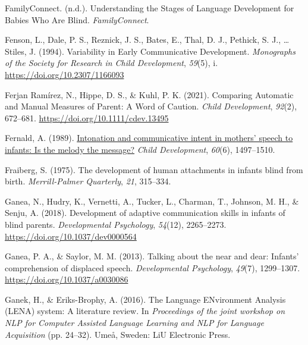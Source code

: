 \documentclass[
  man,floatsintext]{apa6}
\newlength{\cslhangindent}
\newlength{\cslentryspacingunit} %
\newenvironment{CSLReferences}[2] %
 {%
  \setlength{\parindent}{0pt}
  \ifodd #1
  \let\oldpar\par
  \def\par{\hangindent=\cslhangindent\oldpar}
  \fi
  \setlength{\parskip}{#2\cslentryspacingunit}
 }%
 {}
\begin{document}
\begin{CSLReferences}{1}{0}
\leavevmode{}%
FamilyConnect. (n.d.). Understanding the {Stages} of {Language Development} for {Babies Who Are Blind}. \emph{FamilyConnect}.

\leavevmode{}%
Fenson, L., Dale, P. S., Reznick, J. S., Bates, E., Thal, D. J., Pethick, S. J., \ldots{} Stiles, J. (1994). Variability in {Early Communicative Development}. \emph{Monographs of the Society for Research in Child Development}, \emph{59}(5), i. \url{https://doi.org/10.2307/1166093}

\leavevmode{}%
Ferjan Ramírez, N., Hippe, D. S., \& Kuhl, P. K. (2021). Comparing {Automatic} and {Manual Measures} of {Parent}: {A Word} of {Caution}. \emph{Child Development}, \emph{92}(2), 672--681. \url{https://doi.org/10.1111/cdev.13495}

\leavevmode{}%
Fernald, A. (1989). \href{https://www.ncbi.nlm.nih.gov/pubmed/2612255}{Intonation and communicative intent in mothers' speech to infants: Is the melody the message?} \emph{Child Development}, \emph{60}(6), 1497--1510.

\leavevmode{}%
Fraiberg, S. (1975). The development of human attachments in infants blind from birth. \emph{Merrill-Palmer Quarterly}, \emph{21}, 315--334.

\leavevmode{}%
Ganea, N., Hudry, K., Vernetti, A., Tucker, L., Charman, T., Johnson, M. H., \& Senju, A. (2018). Development of adaptive communication skills in infants of blind parents. \emph{Developmental Psychology}, \emph{54}(12), 2265--2273. \url{https://doi.org/10.1037/dev0000564}

\leavevmode{}%
Ganea, P. A., \& Saylor, M. M. (2013). Talking about the near and dear: {Infants}' comprehension of displaced speech. \emph{Developmental Psychology}, \emph{49}(7), 1299--1307. \url{https://doi.org/10.1037/a0030086}

\leavevmode{}%
Ganek, H., \& Eriks-Brophy, A. (2016). The {Language ENvironment Analysis} ({LENA}) system: {A} literature review. In \emph{Proceedings of the joint workshop on {NLP} for {Computer Assisted Language Learning} and {NLP} for {Language Acquisition}} (pp. 24--32). {Umeå, Sweden}: {LiU Electronic Press}.


\end{CSLReferences}
\end{document}
